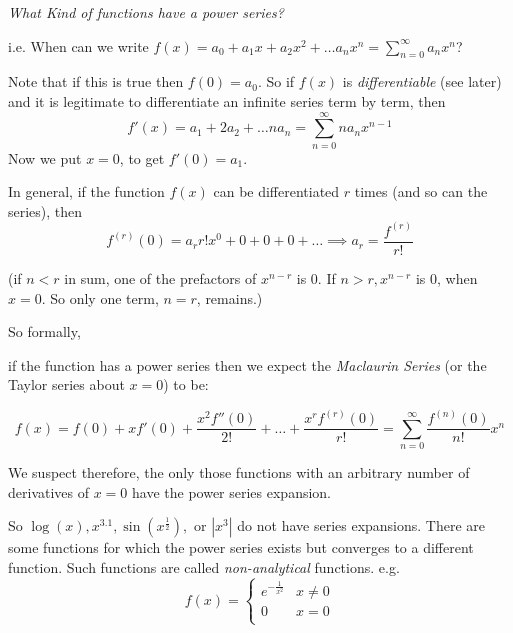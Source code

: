 \documentclass[twoside]{scrartcl}
\begin{document}
 














\textit{What Kind of functions have a power series?}

i.e. When can we write $\displaystyle{f(x) = a_0 + a_1x + a_2x^2 + \dots a_nx^n = \sum_{n=0}^{\infty} a_nx^n}$?

Note that if this is true then $f(0) = a_0$. So if $f(x)$ is \emph{differentiable} (see later)  and it is legitimate to differentiate an infinite series term by term, then \[f'(x) = a_1 + 2a_2 + \dots na_n = \sum_{n=0}^{\infty} na_nx^{n-1}\] Now we put $x=0$, to get $f'(0) = a_1$.

In general, if the function $f(x)$ can be differentiated $r$ times (and so can the series), then \[f^{(r)}(0) = a_r r!x^0 + 0 + 0 + 0 + \dots \implies \boxed{a_r = \dfrac{f^{(r)}}{r!}}\]

(if $n<r$ in sum, one of the prefactors of $x^{n-r}$ is 0. If $n>r, x^{n-r}$ is 0, when $x=0$. So only one term, $n=r$, remains.)

So formally,\\

\begin{definition} if the function has a power series then we expect the \emph{Maclaurin Series} (or the Taylor series about $x=0$) to be:

\[\displaystyle{f(x) = f(0) + xf'(0) + \frac{x^2f''(0)}{2!} + \dots + \frac{x^rf^{(r)}(0)}{r!} = \sum_{n=0}^{\infty} \frac{f^{(n)}(0)}{n!} x^n}\]

\end{definition}

We suspect therefore, the only those functions with an arbitrary number of derivatives of $x=0$ have the power series expansion.

So $\log(x), x^{3.1}, \sin(x^{\frac{1}{2}}),$ or $|x^3|$ do not have series expansions. There are some functions for which the power series exists but converges to a different function. Such functions are called \emph{non-analytical} functions. e.g.
\[f(x) = \begin{cases}
 e^{-\frac{1}{x^2}} & x \neq 0\\
0 & x=0\\
 \end{cases}\]
 
\end{document}
